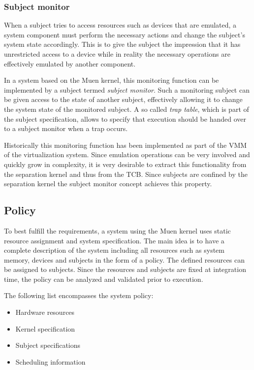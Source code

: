 \subsubsection{Subject monitor}
When a subject tries to access resources such as devices that are emulated, a
system component must perform the necessary actions and change the subject's
system state accordingly. This is to give the subject the impression that it
has unrestricted access to a device while in reality the necessary operations
are effectively emulated by another component.

In a system based on the Muen kernel, this monitoring function can be
implemented by a subject termed \emph{subject monitor}. Such a monitoring
subject can be given access to the state of another subject, effectively
allowing it to change the system state of the monitored subject. A so called
\emph{trap table}, which is part of the subject specification, allows to
specify that execution should be handed over to a subject monitor when a trap
occurs.

Historically this monitoring function has been implemented as part of the VMM
of the virtualization system. Since emulation operations can be very involved
and quickly grow in complexity, it is very desirable to extract this
functionality from the separation kernel and thus from the TCB. Since subjects
are confined by the separation kernel the subject monitor concept achieves this
property.

\subsection{Policy}\label{subsec:policy}
To best fulfill the requirements, a system using the Muen kernel uses static
resource assignment and system specification. The main idea is to have a
complete description of the system including all resources such as system
memory, devices and subjects in the form of a policy. The defined resources can
be assigned to subjects. Since the resources and subjects are fixed at
integration time, the policy can be analyzed and validated prior to execution.

The following list encompasses the system policy:
\begin{itemize}
	\item Hardware resources
	\item Kernel specification
	\item Subject specifications
	\item Scheduling information
\end{itemize}

